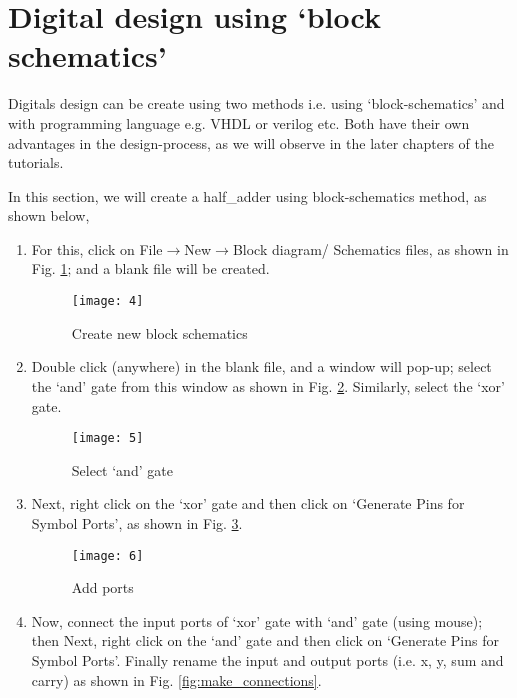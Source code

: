 \section{ Digital design using `block schematics'}
Digitals design can be create using two methods i.e. using `block-schematics' and with programming language e.g. VHDL or verilog etc. Both have their own advantages in the design-process, as we will observe in the later chapters of the tutorials. 

In this section, we will create a half\_adder using block-schematics method, as shown below,

\begin{enumerate}
	
	\item For this, click on File$\rightarrow$New$\rightarrow$Block diagram/ Schematics files, as shown in Fig. \ref{fig:block_schematics}; and a blank file will be created.
	
	\begin{figure}
		\centering
		\texttt{[image: 4]}
		\caption{Create new block schematics}
		\label{fig:block_schematics}
	\end{figure}
	
	\item Double click (anywhere) in the blank file, and a window will pop-up; select the `and' gate from this window as shown in Fig. \ref{fig:select_gate}. Similarly, select the `xor' gate. 
	
	\begin{figure}
		\centering
		\texttt{[image: 5]}
		\caption{Select `and' gate}
		\label{fig:select_gate}
	\end{figure}
	
	\item Next, right click on the `xor' gate and then click on `Generate Pins for Symbol Ports', as shown in Fig. \ref{fig:add_pins}. 
	
	\begin{figure}
		\centering
		\texttt{[image: 6]}
		\caption{Add ports}
		\label{fig:add_pins}
	\end{figure}
	
	\item Now, connect the input ports of `xor' gate with `and' gate (using mouse); then Next, right click on the `and' gate and then click on `Generate Pins for Symbol Ports'. Finally rename the input and output ports (i.e. x, y, sum and carry) as shown in Fig. \ref{fig:make_connections}. 
	

\end{enumerate}
